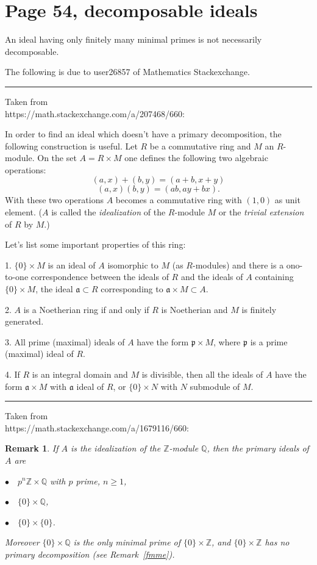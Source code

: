 \documentclass[parskip=half]{scrartcl}%
\newcommand{\mf}{\mathfrak}
\newtheorem{rk}[thm]{Remark}
\begin{document}
\section{Page 54, decomposable ideals}\label{di}%

An ideal having only finitely many minimal primes is not necessarily decomposable.

The following is due to user26857 of Mathematics Stackexchange.\bigskip\bigskip

\hrule\bigskip

Taken from\\ https://math.stackexchange.com/a/207468/660:

In order to find an ideal which doesn't have a primary decomposition, the following construction is useful. Let $R$ be a commutative ring and $M$ an $R$-module. On the set $A=R\times M$ one defines the following two algebraic operations:
$$
(a,x)+(b,y)=(a+b,x+y)
$$
$$
(a,x)(b,y)=(ab,ay+bx).
$$
With these two operations $A$ becomes a commutative ring with $(1,0)$ as unit element. ($A$
is called the \emph{idealization} of the $R$-module $M$ or the \emph{trivial extension} of $R$ by $M$.)

Let's list some important properties of this ring:

1. $\{0\}\times M$ is an ideal of $A$ isomorphic to $M$ (as $R$-modules) and there is a ono-to-one correspondence between the ideals of $R$ and the ideals of $A$ containing $\{0\}\times M$, the ideal $\mf a\subset R$ corresponding to $\mf a\times M\subset A$.

2. $A$ is a Noetherian ring if and only if $R$ is Noetherian and $M$ is finitely generated.

3. All prime (maximal) ideals of $A$ have the form $\mf p\times M$, where $\mf p$ is a prime (maximal) ideal of $R$.

4. If $R$ is an integral domain and $M$ is divisible, then all the ideals of $A$ have the form $\mf a\times M$ with $\mf a$ ideal of $R$, or $\{0\}\times N$ with $N$ submodule of $M$.\bigskip\bigskip

\hrule\bigskip%

Taken from\\ https://math.stackexchange.com/a/1679116/660:\bigskip

\begin{rk}%
If $A$ is the idealization of the $\mathbb Z$-module $\mathbb Q$, then the primary ideals of $A$ are  

$\bullet\quad p^n\mathbb Z\times\mathbb Q$ with $p$ prime, $n\ge1$, 

$\bullet\quad\{0\}\times\mathbb Q$,

$\bullet\quad\{0\}\times\{0\}$. 

Moreover $\{0\}\times\mathbb Q$ is the only minimal prime of $\{0\}\times\mathbb Z$, and $\{0\}\times\mathbb Z$ has no primary decomposition (see Remark~\ref{fmme}).
\end{rk}\bigskip
\end{document}
